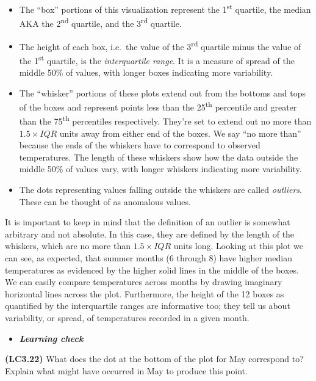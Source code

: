 \documentclass[12pt, krantz2,]{krantz}
\providecommand{\tightlist}{%
  \setlength{\itemsep}{0pt}\setlength{\parskip}{0pt}}
\newenvironment{rmdblock}[1]
  {\begin{shaded*}
  \begin{itemize}
  \renewcommand{\labelitemi}{
    \raisebox{-.7\height}[0pt][0pt]{
    }
  }
  \item
  }
  {
  \end{itemize}
  \end{shaded*}
  }
\newenvironment{learncheck}
  {\begin{rmdblock}{warning}}
  {\end{rmdblock}}
\begin{document}
\begin{itemize}
\tightlist
\item
  The ``box'' portions of this visualization represent the 1\textsuperscript{st} quartile, the median AKA the 2\textsuperscript{nd} quartile, and the 3\textsuperscript{rd} quartile.
\item
  The height of each box, i.e.~the value of the 3\textsuperscript{rd} quartile minus the value of the 1\textsuperscript{st} quartile, is the \emph{interquartile range}. It is a measure of spread of the middle 50\% of values, with longer boxes indicating more variability.
\item
  The ``whisker'' portions of these plots extend out from the bottoms and tops of the boxes and represent points less than the 25\textsuperscript{th} percentile and greater than the 75\textsuperscript{th} percentiles respectively. They're set to extend out no more than \(1.5 \times IQR\) units away from either end of the boxes. We say ``no more than'' because the ends of the whiskers have to correspond to observed temperatures. The length of these whiskers show how the data outside the middle 50\% of values vary, with longer whiskers indicating more variability.
\item
  The dots representing values falling outside the whiskers are called \emph{outliers}. These can be thought of as anomalous values.
\end{itemize}

It is important to keep in mind that the definition of an outlier is somewhat arbitrary and not absolute. In this case, they are defined by the length of the whiskers, which are no more than \(1.5 \times IQR\) units long. Looking at this plot we can see, as expected, that summer months (6 through 8) have higher median temperatures as evidenced by the higher solid lines in the middle of the boxes. We can easily compare temperatures across months by drawing imaginary horizontal lines across the plot. Furthermore, the height of the 12 boxes as quantified by the interquartile ranges are informative too; they tell us about variability, or spread, of temperatures recorded in a given month.

\begin{learncheck}
\textbf{\emph{Learning check}}
\end{learncheck}

\textbf{(LC3.22)} What does the dot at the bottom of the plot for May correspond to? Explain what might have occurred in May to produce this point.
\end{document}
